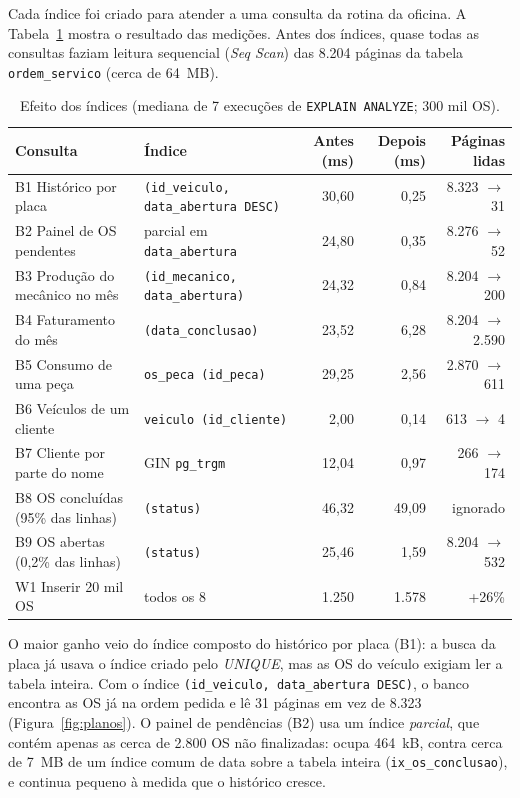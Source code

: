 \documentclass[a4paper,12pt]{article}
\newcommand{\cod}[1]{\texttt{\small #1}}
\begin{document}
Cada índice foi criado para atender a uma consulta da rotina da oficina.
A Tabela~\ref{tab:indices} mostra o resultado das medições. Antes dos
índices, quase todas as consultas faziam leitura sequencial
(\emph{Seq Scan}) das 8.204 páginas da tabela \cod{ordem\_servico}
(cerca de 64~MB).

\begin{table}[!htbp]
  \centering
  \caption{Efeito dos índices (mediana de 7 execuções de \texttt{EXPLAIN ANALYZE}; 300 mil OS).}
  \label{tab:indices}
  \footnotesize\setlength{\tabcolsep}{4pt}\renewcommand{\cod}[1]{\texttt{#1}}
  \begin{tabular}{p{4.1cm}p{3.6cm}rrr}
    \hline
    Consulta & Índice & Antes (ms) & Depois (ms) & Páginas lidas \\ \hline
    B1 Histórico por placa & \cod{(id\_veiculo, data\_abertura DESC)} & 30,60 & 0,25 & 8.323 $\rightarrow$ 31 \\
    B2 Painel de OS pendentes & parcial em \cod{data\_abertura} & 24,80 & 0,35 & 8.276 $\rightarrow$ 52 \\
    B3 Produção do mecânico no mês & \cod{(id\_mecanico, data\_abertura)} & 24,32 & 0,84 & 8.204 $\rightarrow$ 200 \\
    B4 Faturamento do mês & \cod{(data\_conclusao)} & 23,52 & 6,28 & 8.204 $\rightarrow$ 2.590 \\
    B5 Consumo de uma peça & \cod{os\_peca (id\_peca)} & 29,25 & 2,56 & 2.870 $\rightarrow$ 611 \\
    B6 Veículos de um cliente & \cod{veiculo (id\_cliente)} & 2,00 & 0,14 & 613 $\rightarrow$ 4 \\
    B7 Cliente por parte do nome & GIN \cod{pg\_trgm} & 12,04 & 0,97 & 266 $\rightarrow$ 174 \\
    B8 OS concluídas (95\% das linhas) & \cod{(status)} & 46,32 & 49,09 & ignorado \\
    B9 OS abertas (0,2\% das linhas) & \cod{(status)} & 25,46 & 1,59 & 8.204 $\rightarrow$ 532 \\ \hline
    W1 Inserir 20 mil OS & todos os 8 & 1.250 & 1.578 & +26\% \\ \hline
  \end{tabular}
\end{table}

O maior ganho veio do índice composto do histórico por placa (B1): a
busca da placa já usava o índice criado pelo \emph{UNIQUE}, mas as OS
do veículo exigiam ler a tabela inteira. Com o índice
\cod{(id\_veiculo, data\_abertura DESC)}, o banco encontra as OS já na
ordem pedida e lê 31 páginas em vez de 8.323
(Figura~\ref{fig:planos}). O painel de pendências (B2) usa um índice
\emph{parcial}, que contém apenas as cerca de 2.800 OS não finalizadas:
ocupa 464~kB, contra cerca de 7~MB de um índice comum de data sobre a
tabela inteira (\cod{ix\_os\_conclusao}), e continua pequeno à medida que o histórico cresce.
\end{document}
